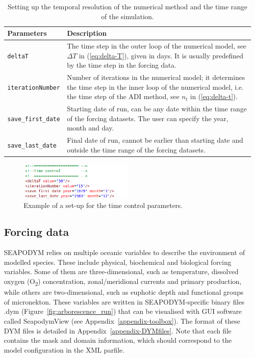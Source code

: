 \begin{table}[H]
\caption{Setting up the temporal resolution of the numerical method and the time range of the simulation.} 
  \centering
  \begin{tabular}{p{3cm}p{12.5cm}}\hline
    {\bfseries Parameters} & {\bfseries Description}\\ \hline
    \texttt{deltaT} & The time step in the outer loop of the numerical model, see $\Delta T$ in (\ref{eq:delta-T}), given in days. It is usually predefined by the time step in the forcing data. \\
    \texttt{iterationNumber} & Number of iterations in the numerical model; it determines the time step in the inner loop of the numerical model, i.e. the time step of the ADI method, see $n_t$ in (\ref{eq:delta-t}). \\  \hline 
     \texttt{save\_first\_date} & Starting date of run, can be any date within the time range of the forcing datasets. The user can specify the year, month and day. \\  \hline 
     \texttt{save\_last\_date} & Final date of run, cannot be earlier than starting date and outside the time range of the forcing datasets. \\\hline 
    \end{tabular}    
\label{table:time_control}    
\end{table}

\begin{figure}[t]
   \centering
   \includegraphics[width=0.5\textwidth]{chapter3/figs/time_control.png}
   \caption{Example of a set-up for the time control parameters.}
   \label{fig:time_control}
 \end{figure}


\subsection{Forcing data}
\label{sec:dym-input}
SEAPODYM relies on multiple oceanic variables to describe the environment of modelled species. These include physical, biochemical and biological forcing variables. Some of them are three-dimensional, such as temperature, dissolved oxygen (O\textsubscript{2}) concentration, zonal/meridional currents and primary production, while others are two-dimensional, such as euphotic depth and functional groups of micronekton. These variables are written in SEAPODYM-specific binary files .dym (Figure~\ref{fig:arborescence_run}) that can be visualised with GUI software called SeapodymView (see Appendix~\ref{appendix-toolbox}). The format of these DYM files is detailed in Appendix~\ref{appendix-DYMfiles}. Note that each file contains the mask and domain information, which should correspond to the model configuration in the XML parfile. 

